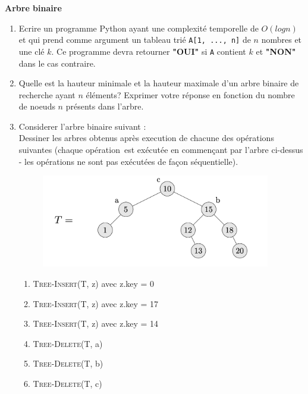 \begin{Exercice}[20 minutes]\textbf{Arbre binaire}\\
	\begin{enumerate}
		\item Ecrire un programme Python ayant une complexité temporelle de $O(log n)$ et qui prend comme argument un tableau trié \lstinline{A[1, ..., n]} de $n$ nombres et une clé $k$. Ce programme devra retourner \textbf{"OUI"} si \lstinline{A} contient $k$ et \textbf{"NON"} dans le cas contraire.
		\item Quelle est la hauteur minimale et la hauteur maximale d'un arbre binaire de recherche ayant $n$ éléments? Exprimer votre réponse en fonction du nombre de noeuds $n$ présents dans l'arbre.
		\item Considerer l'arbre binaire suivant : \\
		
		Dessiner les arbres obtenus après execution de chacune des opérations suivantes (chaque opération~est exécutée en commençant par l'arbre ci-dessus - les opérations ne sont pas exécutées de façon séquentielle).
		
		\begin{figure}[h!]
        			\centering
       	 		\includegraphics[width=10cm]{resources/exoArbreBinEnonce.png}
	    	\end{figure}
		\begin{enumerate}
			\item \textsc{Tree-Insert}(T, z) avec z.key = 0
			\item \textsc{Tree-Insert}(T, z) avec z.key = 17
			\item \textsc{Tree-Insert}(T, z) avec z.key = 14
			\item \textsc{Tree-Delete}(T, a)
			\item \textsc{Tree-Delete}(T, b)
			\item \textsc{Tree-Delete}(T, c)
		\end{enumerate}



\end{enumerate}
\end{Exercice}
